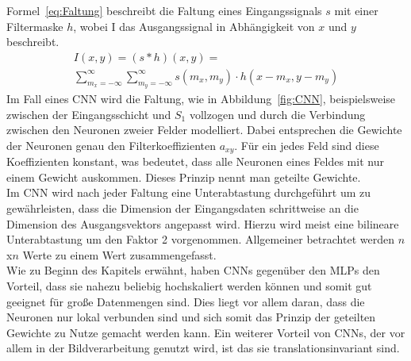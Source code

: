 \documentclass[times, 11pt,twocolumn]{article}
\begin{document}
\small  
Formel~\ref{eq:Faltung} beschreibt die Faltung eines Eingangssignals $s$ mit einer Filtermaske $h$, wobei I das Ausgangssignal in Abhängigkeit von $x$ und $y$ beschreibt.
\footnotesize
\begin{equation}
\begin{aligned}
I(x,y) = (s*h)(x,y) = \\
\sum_{m_x=-\infty}^\infty \sum_{m_y=-\infty}^\infty s(m_x,m_y) \cdot h(x-m_x,y-m_y) 
\end{aligned}
	\label{eq:Faltung}
\end{equation}
\small
Im Fall eines CNN wird die Faltung, wie in Abbildung~\ref{fig:CNN}, beispielsweise zwischen der Eingangsschicht und $S_1$ vollzogen und durch die Verbindung zwischen den Neuronen zweier Felder modelliert. Dabei entsprechen die Gewichte der Neuronen genau den Filterkoeffizienten $a_{xy}$. Für ein jedes Feld sind diese Koeffizienten konstant, was bedeutet, dass alle Neuronen eines Feldes mit nur einem Gewicht auskommen. Dieses Prinzip nennt man geteilte Gewichte. \\
Im CNN wird nach jeder Faltung eine Unterabtastung durchgeführt um zu gewährleisten, dass die Dimension der Eingangsdaten schrittweise an die Dimension des Ausgangsvektors angepasst wird. Hierzu wird meist eine bilineare Unterabtastung um den Faktor 2 vorgenommen. Allgemeiner betrachtet werden $n$x$n$ Werte zu einem Wert zusammengefasst.\\
Wie zu Beginn des Kapitels erwähnt, haben CNNs gegenüber den MLPs den Vorteil, dass sie nahezu beliebig hochskaliert werden können und somit gut geeignet für große Datenmengen sind. Dies liegt vor allem daran, dass die Neuronen nur lokal verbunden sind und sich somit das Prinzip der geteilten Gewichte zu Nutze gemacht werden kann. Ein weiterer Vorteil von CNNs, der vor allem in der Bildverarbeitung genutzt wird, ist das sie translationsinvariant sind.
\end{document}
